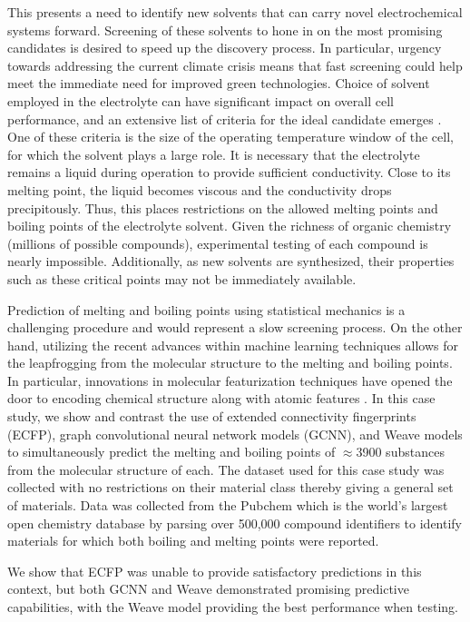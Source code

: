 \documentclass[book.tex]{subfiles}
\begin{document}
This presents a need to identify new solvents that can carry novel electrochemical systems forward. Screening of these solvents to hone in on the most promising candidates is desired to speed up the discovery process. In particular, urgency towards addressing the current climate crisis means that fast screening could help meet the immediate need for improved green technologies. Choice of solvent employed in the electrolyte can have significant impact on overall cell performance, and an extensive list of criteria for the ideal candidate emerges \cite{Ue2014}. One of these criteria is the size of the operating temperature window of the cell, for which the solvent plays a large role. It is necessary that the electrolyte remains a liquid during operation to provide sufficient conductivity.  Close to its melting point, the liquid becomes viscous and the conductivity drops precipitously.  Thus, this places restrictions on the allowed melting points and boiling points of the electrolyte solvent.  Given the richness of organic chemistry (millions of possible compounds), experimental testing of each compound is nearly impossible. Additionally, as new solvents are synthesized, their properties such as these critical points may not be immediately available. 

Prediction of melting and boiling points using statistical mechanics is a challenging procedure and would represent a slow screening process. On the other hand, utilizing the recent advances within machine learning techniques allows for the leapfrogging from the molecular structure to the melting and boiling points. In particular, innovations in molecular featurization techniques have opened the door to encoding chemical structure along with atomic features \cite{Wu2018MoleculeNet:Learning}. In this case study, we show and contrast the use of extended connectivity fingerprints (ECFP), graph convolutional neural network models (GCNN), and Weave models to simultaneously predict the melting and boiling points of $\approx$3900 substances from the molecular structure of each. The dataset used for this case study was collected with no restrictions on their material class thereby giving a general set of materials. Data was collected from the Pubchem which is the world’s largest open chemistry database \cite{10.1093/nar/gky1033} by parsing over 500,000 compound identifiers to identify materials for which both boiling and melting points were reported.


We show that ECFP was unable to provide satisfactory predictions in this context, but both GCNN and Weave demonstrated promising predictive capabilities, with the Weave model providing the best performance when testing. 
\end{document}
